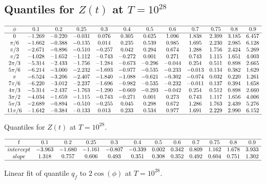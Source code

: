 \documentclass[twoside]{article}
\begin{document}
\subsection{\label{E28}Quantiles for $Z(t)$ at $T=10^{28}$}

\begin{table}
\centering \(\begin{array}{cccccccccccc}
\hline
\phi&0.1&0.2&0.25&0.3&0.4&0.5&0.6&0.7&0.75&0.8&0.9 \\
\hline
0&-1.269&-0.220&-0.031&0.076&0.305&0.625&1.096&1.838&2.399&3.185&6.457\\
\pi/6 &-1.662&-0.388&-0.135&0.014&0.235&0.539&0.985&1.695&2.230&2.985&6.128\\
\pi/3 &-2.671&-0.896&-0.510&-0.257&0.042&0.294&0.674&1.288&1.756&2.424&5.269\\
\pi/2 &-4.028&-1.652&-1.112&-0.743&-0.272&0.001&0.271&0.743&1.115&1.651&4.003\\
2\pi/3 &-5.314&-2.433&-1.756&-1.284&-0.673&-0.296&-0.044&0.254&0.511&0.898&2.665\\
5\pi/6 &-6.214&-3.000&-2.232&-1.693&-0.977&-0.535&-0.233&-0.013&0.134&0.382&1.629\\
\pi &-6.524&-3.206&-2.407&-1.840&-1.088&-0.621&-0.302&-0.074&0.032&0.220&1.261\\
7\pi/6 &-6.220&-3.012&-2.237&-1.696&-0.982&-0.535&-0.232&-0.011&0.137&0.394&1.658\\
4\pi/3 &-5.314&-2.437&-1.763&-1.290&-0.669&-0.293&-0.042&0.254&0.512&0.898&2.660\\
3\pi/2 &-4.034&-1.659&-1.115&-0.743&-0.271&0.001&0.273&0.743&1.117&1.656&4.006\\
5\pi/3 &-2.689&-0.894&-0.510&-0.255&0.045&0.298&0.672&1.286&1.763&2.439&5.276\\
11\pi/6 &-1.642&-0.384&-0.133&0.013&0.233&0.534&0.977&1.691&2.229&2.990&6.152\\
\hline
\end{array}\)
\caption{Quantiles  for  $Z(t)$ at $T=10^{28}$.}
\label{tab:quantiles28}
\end{table}

\begin{table}
\centering \(\begin{array}{cccccccccccc}
\hline
$f$&0.1&0.2&0.25&0.3&0.4&0.5&0.6&0.7&0.75&0.8&0.9\\
\hline
intercept&-3.963&-1.680&-1.161&-0.807&-0.339&0.002&0.342&0.809&1.162&1.678&3.933\\
slope&1.318&0.757&0.606&0.493&0.351&0.308&0.352&0.492&0.604&0.751&1.302\\
\hline
\end{array}\)
\caption{Linear fit of quantile $q_f$ to $2\cos(\phi)$ at $T=10^{28}$.}
\label{tab:fit28}
\end{table}
\end{document}
